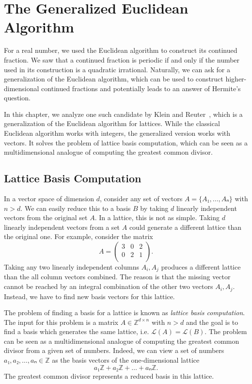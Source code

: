 \chapter{The Generalized Euclidean Algorithm}
\label{ch:generalized-euclidean}

For a real number, we used the Euclidean algorithm to construct its continued
fraction.
We saw that a continued fraction is periodic if and only if the number used in
its construction is a quadratic irrational.
Naturally, we can ask for a generalization of the Euclidean algorithm,
which can be used to construct higher-dimensional continued fractions
and potentially leads to an answer of Hermite's question.

In this chapter, we analyze one such candidate by Klein and Reuter~\cite{Klein24},
which is a generalization of the Euclidean algorithm for lattices.
While the classical Euclidean algorithm works with integers,
the generalized version works with vectors.
It solves the problem of lattice basis computation,
which can be seen as a multidimensional analogue of computing the greatest
common divisor.

\section{Lattice Basis Computation}
\label{sec:lattice-basis-computation}

In a vector space of dimension $d$, consider any set of vectors $A = \{A₁, …, Aₙ\}$ with $n > d$.
We can easily reduce this to a basis $B$ by taking $d$ linearly independent vectors from the original set $A$.
In a lattice, this is not as simple.
Taking $d$ linearly independent vectors from a set $A$ could generate a
different lattice than the original one.
For example, consider the matrix
\[
  A = \begin{pmatrix}
    3 & 0 & 2 \\
    0 & 2 & 1 \\
  \end{pmatrix}.
\]
Taking any two linearly independent columns $A_i, A_j$
produces a different lattice than the all column vectors combined.
The reason is that the missing vector cannot be reached by an
integral combination of the other two vectors $A_i, A_j$.
Instead, we have to find new basis vectors for this lattice.

The problem of finding a basis for a lattice is known as \emph{lattice basis computation}.
The input for this problem is a matrix $A ∈ ℤ^{d×n}$ with $n > d$ and the goal
is to find a basis which generates the same lattice,
i.e. $\mathcal L(A) = \mathcal L(B)$.
The problem can be seen as a multidimensional analogue of
computing the greatest common divisor from a given set of numbers.
Indeed, we can view a set of numbers $a₁, a₂, …, aₙ ∈ ℤ$ as the basis vectors
of the one-dimensional lattice
\[
  a₁ℤ + a₂ ℤ + \dots + aₙ ℤ.
\]
The greatest common divisor represents a reduced basis in this lattice.

